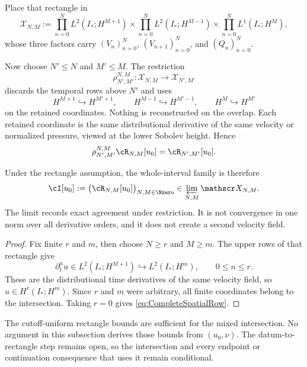 Place that rectangle in
\[
  \mathscr X_{N,M}
  :=
  \prod_{n=0}^{N}L^2(I_*;H^{M+1})
  \times
  \prod_{n=0}^{N}L^2(I_*;H^{M-1})
  \times
  \prod_{n=0}^{N}L^1(I_*;H^M),
\]
whose three factors carry \((V_n)_{n=0}^{N}\),
\((V_{n+1})_{n=0}^{N}\), and \((Q_n)_{n=0}^{N}\).

Now choose \(N'\leq N\) and \(M'\leq M\).
The restriction
\[
  \rho_{N',M'}^{N,M}:\mathscr X_{N,M}\longrightarrow\mathscr X_{N',M'}
\]
discards the temporal rows above \(N'\) and uses
\[
  H^{M+1}\hookrightarrow H^{M'+1},
  \qquad
  H^{M-1}\hookrightarrow H^{M'-1},
  \qquad
  H^M\hookrightarrow H^{M'}
\]
on the retained coordinates.
Nothing is reconstructed on the overlap.
Each retained coordinate is the same distributional derivative of the same velocity or normalized pressure, viewed at the lower Sobolev height.
Hence
\begin{equation}\label{eq:BodyRectangleRestrictionCompatibility}
  \rho_{N',M'}^{N,M}\cR_{N,M}[u_0]
  =\cR_{N',M'}[u_0].
\end{equation}

Under the rectangle assumption, the whole-interval family is therefore
\begin{equation}\label{eq:DatumSpecificCompatibleIntersection}
  \cI[u_0]
  :=\bigl(\cR_{N,M}[u_0]\bigr)_{N,M\in\Nzero}
  \in\varprojlim_{N,M}\mathscr X_{N,M}.
\end{equation}
The limit records exact agreement under restriction.
It is not convergence in one norm over all derivative orders, and it does not create a second velocity field.


\begin{proof}
Fix finite \(r\) and \(m\), then choose \(N\geq r\) and \(M\geq m\).
The upper rows of that rectangle give
\[
  \partial_t^nu\in L^2(I_*;H^{M+1})
  \hookrightarrow L^2(I_*;H^m),
  \qquad 0\leq n\leq r.
\]
These are the distributional time derivatives of the same velocity field, so
\(u\in H^r(I_*;H^m)\).
Since \(r\) and \(m\) were arbitrary, all finite coordinates belong to the intersection.
Taking \(r=0\) gives \eqref{eq:CompleteSpatialRow}.
\end{proof}

The cutoff-uniform rectangle bounds are sufficient for the mixed intersection.
No argument in this subsection derives those bounds from \((u_0,\nu)\).
The datum-to-rectangle step remains open, so the intersection and every endpoint or continuation consequence that uses it remain conditional.
